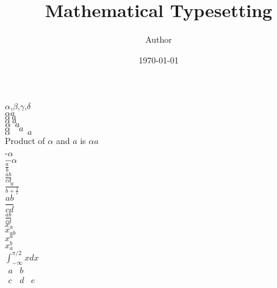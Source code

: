 \documentclass[12pt,a4paper]{article}
\title{Mathematical Typesetting}
\author{Author}
\date{\today}
\begin{document}
\maketitle
$\alpha$,$\beta$,$\gamma$,$\delta$ \\
$\alpha a$\\

$\alpha \, a$\\ %
$\alpha \ a$\\ %
$\alpha \enskip a $\\ %
$\alpha \quad a$\\ %
$\alpha \qquad a$\\



Product of $\alpha$ and $a$ is $\alpha a$\\ 

-$\alpha$	\\
$-\alpha$	\\

$\frac a b$\\
$\frac {ab} {cd}$ \\  %
$\frac {a} {b+\frac{1}{c}}$ \\

$\dfrac{ab}{cd}$ \\ %
$\tfrac{ab}{cd}$ \\	 %

$x_a$ \\  %
$x_{ab}$ \\
$x^a$ \\ %
$x_a^b$ \\		

$\int_{-\infty}^{\pi/2}xdx$ \\

$\begin{matrix}
a & b \\        %
c & d & e
\end{matrix}$ \\
\end{document}
